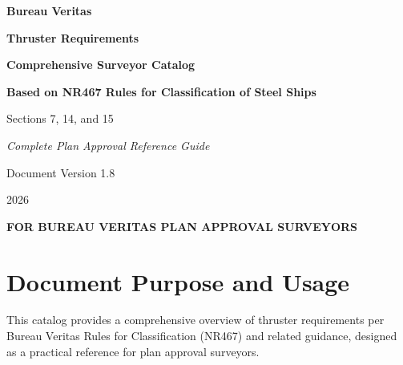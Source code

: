 \documentclass[11pt,a4paper]{report}
\begin{document}
\begin{titlepage}
    \centering
    \vspace*{2cm}
    
    {\Huge\bfseries\color{bvblue} Bureau Veritas\par}
    \vspace{0.5cm}
    {\LARGE\bfseries Thruster Requirements\par}
    \vspace{0.3cm}
    {\LARGE\bfseries Comprehensive Surveyor Catalog\par}
    
    \vspace{2cm}
    
    {\Large\bfseries Based on NR467 Rules for Classification of Steel Ships\par}
    \vspace{0.5cm}
    {\large Sections 7, 14, and 15\par}
    
    \vspace{2cm}
    
    {\large\textit{Complete Plan Approval Reference Guide}\par}
    
    \vfill
    
    {\large Document Version 1.8\par}
    {\large 2026\par}
    
    \vspace{1cm}
    
    {\small\textcolor{warningred}{\textbf{FOR BUREAU VERITAS PLAN APPROVAL SURVEYORS}}\par}
    
\end{titlepage}

\tableofcontents
\newpage

\chapter*{Document Purpose and Usage}

This catalog provides a comprehensive overview of thruster requirements per Bureau Veritas Rules for Classification (NR467) and related guidance, designed as a practical reference for plan approval surveyors.
\end{document}
